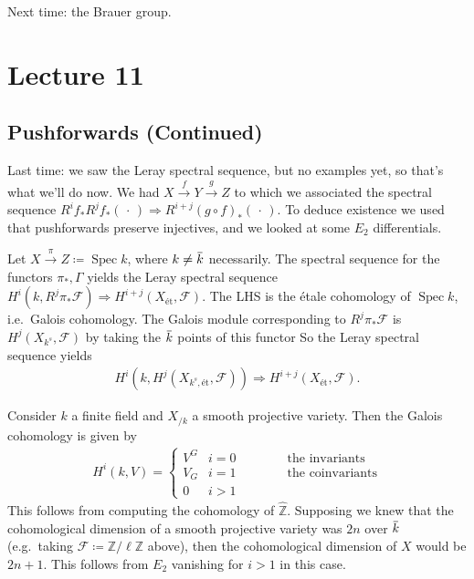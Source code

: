 Next time: the Brauer group.

\hypertarget{lecture-11}{%
\section{Lecture 11}\label{lecture-11}}

\hypertarget{pushforwards-continued}{%
\subsection{Pushforwards (Continued)}\label{pushforwards-continued}}

Last time: we saw the Leray spectral sequence, but no examples yet, so
that's what we'll do now. We had
\(X \xrightarrow{f} Y \xrightarrow{g} Z\) to which we associated the
spectral sequence
\(R^i f_* R^jf_*({\,\cdot\,}) \Rightarrow R^{i+j}(g\circ f)_* ({\,\cdot\,})\).
To deduce existence we used that pushforwards preserve injectives, and
we looked at some \(E_2\) differentials.

\begin{example}[?]

Let \(X \xrightarrow{\pi} Z \coloneqq\operatorname{Spec}k\), where
\(k\neq \mkern 1.5mu\overline{\mkern-1.5muk\mkern-1.5mu}\mkern 1.5mu\)
necessarily. The spectral sequence for the functors \(\pi_*, \Gamma\)
yields the Leray spectral sequence
\(H^i(k, R^j \pi_* \mathcal{F}) \Rightarrow H^{i+j}(X_\text{ét}, \mathcal{F})\).
The LHS is the étale cohomology of \(\operatorname{Spec}k\), i.e.~Galois
cohomology. The Galois module corresponding to \(R^j \pi_* \mathcal{F}\)
is \(H^j(X_{k^{s}}, \mathcal{F})\) by taking the
\(\mkern 1.5mu\overline{\mkern-1.5muk\mkern-1.5mu}\mkern 1.5mu\) points
of this functor So the Leray spectral sequence yields
\begin{align*}  
H^i(k, H^j(X_{k^{s}, \text{ét}}, \mathcal{F} )) \Rightarrow H^{i+j}(X_\text{ét}, \mathcal{F})
.\end{align*}

Consider \(k\) a finite field and \(X_{/k}\) a smooth projective
variety. Then the Galois cohomology is given by
\begin{align*}  
H^i(k, V) 
=
\begin{cases}
V^G & i = 0 \hspace{4em}\text{the invariants}\\
V_G & i = 1\hspace{4em}\text{the coinvariants} \\
0 & i>1
\end{cases}
\end{align*}
This follows from computing the cohomology of
\(\widehat{{\mathbb{Z}}}\). Supposing we knew that the cohomological
dimension of a smooth projective variety was \(2n\) over
\(\mkern 1.5mu\overline{\mkern-1.5muk\mkern-1.5mu}\mkern 1.5mu\)
(e.g.~taking \(\mathcal{F} \coloneqq\mathbb{Z}/\ell\mathbb{Z}\) above),
then the cohomological dimension of \(X\) would be \(2n+1\). This
follows from \(E_2\) vanishing for \(i>1\) in this case.

\end{example}


